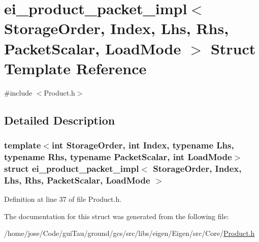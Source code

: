 \hypertarget{structei__product__packet__impl}{\section{ei\-\_\-product\-\_\-packet\-\_\-impl$<$ Storage\-Order, Index, Lhs, Rhs, Packet\-Scalar, Load\-Mode $>$ Struct Template Reference}
\label{structei__product__packet__impl}
}


{\ttfamily \#include $<$Product.\-h$>$}



\subsection{Detailed Description}
\subsubsection*{template$<$int Storage\-Order, int Index, typename Lhs, typename Rhs, typename Packet\-Scalar, int Load\-Mode$>$struct ei\-\_\-product\-\_\-packet\-\_\-impl$<$ Storage\-Order, Index, Lhs, Rhs, Packet\-Scalar, Load\-Mode $>$}



Definition at line 37 of file Product.\-h.



The documentation for this struct was generated from the following file\-:\begin{DoxyCompactItemize}
\item 
/home/jose/\-Code/gui\-Tau/ground/gcs/src/libs/eigen/\-Eigen/src/\-Core/\hyperlink{_product_8h}{Product.\-h}\end{DoxyCompactItemize}
